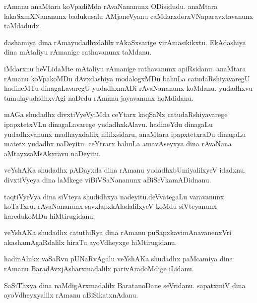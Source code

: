 \documentclass{article}
\begin{document}
\begin{mn}%
rAmanu anaMtara koVpadiMda rAvaNananunx ODisidudu. anaMtara lakaSxmXNananunx badukusalu 
AMjaneVyanu caMdarxdorxVNaparavxtavanunx taMdadudx.
\end{mn}

\begin{mn}%
dashamiya dina rAmayudadhxdalilx rAkaSxsarige virAmasikikxtu. EkAdashiya dina mAtaliyu 
rAmanige rathavanunx taMdanu.
\end{mn}

\begin{mn}%
iMdarxnu heVLidaMte mAtaliyu rAmanige rathavanunx apiRsidanu. anaMtara rAmanu koVpakoMDu 
dAvxdashiya modalogxMDu bahuLa catudaRshiyavaregU hadineMTu dinagaLavaregU yudadhxmADi 
rAvaNananunx koMdanu. yudadhxvu tumulayudadhxvAgi naDedu rAmanu jayavanunx hoMdidanu.
\end{mn}

\begin{mn}%
mAGa shudadhx divxtiVyeVyiMda ceYtarx kaqSaNx catudaRshiyavarege ipapxtetxVLu 
dinagaLavarege yudadhxkAlavu. hadineYdu dinagaLu yudadhxvanunx madhayxdalilx nililxsidaru, 
anaMtara ipapxtetxraDu dinagaLu matetx yudadhx naDeyitu. ceYtrarx bahuLa amavAseyxya dina 
rAvaNana aMtayxsaMsAkxravu naDeyitu.
\end{mn}

\begin{mn}%
veYshAKa shudadhx pADayxda dina rAmanu yudadhxbUmiyalilxyeV idadxnu. divxtiVyeya dina 
laMkege viBiVSaNananunx aBiSeVkamADidnanu.
\end{mn}

\begin{mn}%
taqtiVyeVya dina siVteya shudidhxya nadeyitu.deVvategaLu varavanunx koTaTxru. rAvaNananunx 
savxlapxkAladalilxyeV koMdu siVteyanunx karedukoMDu hiMtirugidanu.
\end{mn}

\begin{mn}%
veYshAKa shudadhx catuthiRya dina rAmanu puSapxkavimAnavanenxVri akashamAgaRdalilx hiraTu 
ayoVdheyxge hiMtirugidanu.
\end{mn}

\begin{mn}%
hadinAlukx vaSaRvu pUNaRvAgalu veYshAKa shudadhx paMcamiya dina rAmanu 
BaradAvxjAsharxmadalilx parivAradoMdige iLidanu.
\end{mn}

\begin{mn}%
SaSiThxya dina naMdigArxmadalilx BaratanoDane seVridanu. sapatxmiV dina ayoVdheyxyalilx 
rAmanu aBiSikatxnAdanu.
\end{mn}
\end{document}
